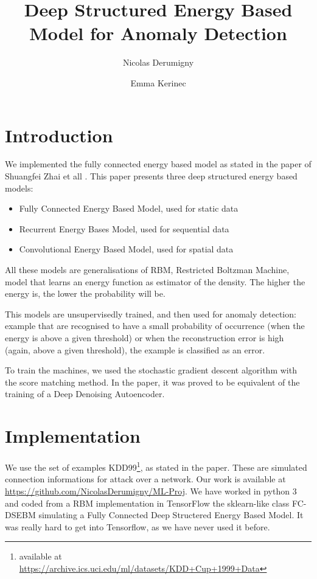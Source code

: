 \documentclass[a4paper]{article}
\title{Deep Structured Energy Based Model for Anomaly Detection}
\author{Nicolas Derumigny \and Emma Kerinec }
\begin{document}
\maketitle

\section{Introduction}
We implemented the fully connected energy based model as stated in the paper of Shuangfei Zhai et all \cite{DBLP:conf/icml/ZhaiCLZ16}.
This paper presents three deep structured energy based models: 
\begin{itemize}
\item Fully Connected Energy Based Model, used for static data
\item Recurrent Energy Bases Model, used for sequential data
\item Convolutional Energy Based Model, used for spatial data
\end{itemize}

All these models are generalisations of RBM, Restricted Boltzman Machine, model that learns an energy function as estimator of the density. The higher the energy is, the lower the probability will be.

This models are unsupervisedly trained, and then used for anomaly detection: example that are recognised to have a small probability of occurrence (when the energy is above a given threshold) or when the reconstruction error is high (again, above a given threshold), the example is classified as an error.


To train the machines, we used the stochastic gradient descent algorithm with the score matching method. In the paper, it was proved to be equivalent of the training of a Deep Denoising Autoencoder.






\section{Implementation}
We use the set of examples KDD99\footnote{available at \url{https://archive.ics.uci.edu/ml/datasets/KDD+Cup+1999+Data}}, as stated in the paper. These are simulated connection informations for attack over a network. 
Our work is available at \url{https://github.com/NicolasDerumigny/ML-Proj}.
We have worked in python 3 and coded from a RBM implementation in  TensorFlow the sklearn-like class FC-DSEBM simulating a Fully Connected Deep Structered Energy Based Model. It was really hard to get into Tensorflow, as we have never used it before. 
\end{document}
